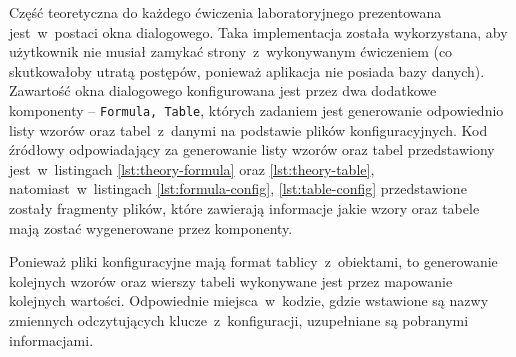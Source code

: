 Część teoretyczna do każdego ćwiczenia laboratoryjnego prezentowana jest~w~postaci okna dialogowego.
Taka implementacja została wykorzystana, aby użytkownik nie musiał zamykać strony~z~wykonywanym
ćwiczeniem (co skutkowałoby utratą postępów, ponieważ aplikacja nie posiada bazy danych). Zawartość
okna dialogowego konfigurowana jest przez dwa dodatkowe komponenty -- \texttt{Formula, Table},
których zadaniem jest generowanie odpowiednio listy wzorów oraz tabel~z~danymi na podstawie plików
konfiguracyjnych. Kod źródłowy odpowiadający za generowanie listy wzorów oraz tabel przedstawiony
jest~w~listingach \ref{lst:theory-formula} oraz \ref{lst:theory-table}, natomiast~w~listingach
\ref{lst:formula-config}, \ref{lst:table-config} przedstawione zostały fragmenty plików, które
zawierają informacje jakie wzory oraz tabele mają zostać wygenerowane przez komponenty.





Ponieważ pliki konfiguracyjne mają format tablicy~z~obiektami, to generowanie kolejnych wzorów oraz
wierszy tabeli wykonywane jest przez mapowanie kolejnych wartości. Odpowiednie miejsca~w~kodzie,
gdzie wstawione są nazwy zmiennych odczytujących klucze~z~konfiguracji, uzupełniane są pobranymi
informacjami.